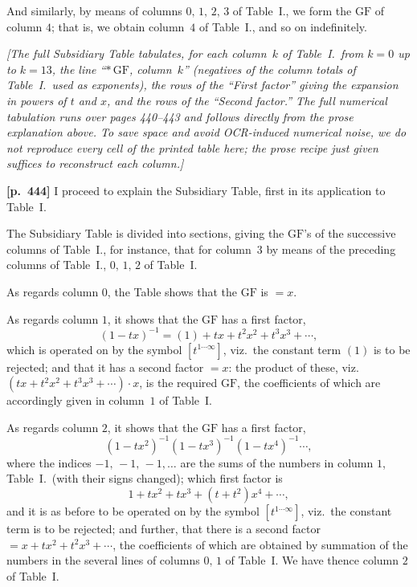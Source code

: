 \documentclass[11pt,a4paper]{article}
\providecommand{\GF}{\mathrm{GF}}
\begin{document}
And similarly, by means of columns $0,\,1,\,2,\,3$ of Table~I., we form the $\GF$ of column $4$; that is, we obtain column~$4$ of Table~I., and so on indefinitely.

\bigskip
\noindent\textit{[The full Subsidiary Table tabulates, for each column~$k$ of Table~I.\ from $k=0$ up to $k=13$, the line ``$*\,\GF$, column~$k$'' (negatives of the column totals of Table~I.\ used as exponents), the rows of the ``First factor'' giving the expansion in powers of $t$ and $x$, and the rows of the ``Second factor.''  The full numerical tabulation runs over pages 440--443 and follows directly from the prose explanation above.  To save space and avoid OCR-induced numerical noise, we do not reproduce every cell of the printed table here; the prose recipe just given suffices to reconstruct each column.]}

\bigskip
\noindent\textbf{[p.~444]}\quad
I proceed to explain the Subsidiary Table, first in its application to Table~I.

The Subsidiary Table is divided into sections, giving the $\GF$'s of the successive columns of Table~I., for instance, that for column~$3$ by means of the preceding columns of Table~I., $0,\,1,\,2$ of Table~I.

\medskip

\noindent As regards column $0$, the Table shows that the $\GF$ is $=x$.

\noindent As regards column $1$, it shows that the $\GF$ has a first factor,
\[
(1-tx)^{-1} = (1) + tx + t^{2}x^{2} + t^{3}x^{3} + \cdots,
\]
which is operated on by the symbol $[t^{1\cdots\infty}]$, viz.\ the constant term $(1)$ is to be rejected; and that it has a second factor $=x$: the product of these, viz.\ $(tx+t^{2}x^{2}+t^{3}x^{3}+\cdots)\cdot x$, is the required $\GF$, the coefficients of which are accordingly given in column~$1$ of Table~I.

\noindent As regards column $2$, it shows that the $\GF$ has a first factor,
\[
(1-tx^{2})^{-1}(1-tx^{3})^{-1}(1-tx^{4})^{-1}\cdots,
\]
where the indices $-1,\,-1,\,-1,\ldots$ are the sums of the numbers in column $1$, Table~I.\ (with their signs changed); which first factor is
\[
1 + tx^{2} + tx^{3} + (t+t^{2})x^{4} + \cdots,
\]
and it is as before to be operated on by the symbol $[t^{1\cdots\infty}]$, viz.\ the constant term is to be rejected; and further, that there is a second factor $=x+tx^{2}+t^{2}x^{3}+\cdots$, the coefficients of which are obtained by summation of the numbers in the several lines of columns $0,\,1$ of Table~I. We have thence column $2$ of Table~I.
\end{document}
